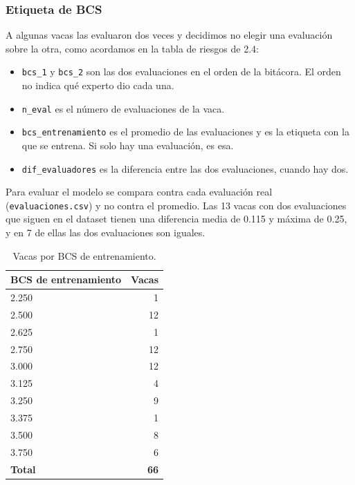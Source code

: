 \subsubsection*{Etiqueta de BCS}

A algunas vacas las evaluaron dos veces y decidimos no elegir una evaluación sobre la otra, como acordamos en la tabla de riesgos de 2.4:

\begin{itemize}
  \item \texttt{bcs\_1} y \texttt{bcs\_2} son las dos evaluaciones en el orden de la bitácora. El orden no indica qué experto dio cada una.
  \item \texttt{n\_eval} es el número de evaluaciones de la vaca.
  \item \texttt{bcs\_entrenamiento} es el promedio de las evaluaciones y es la etiqueta con la que se entrena. Si solo hay una evaluación, es esa.
  \item \texttt{dif\_evaluadores} es la diferencia entre las dos evaluaciones, cuando hay dos.
\end{itemize}

Para evaluar el modelo se compara contra cada evaluación real (\nolinkurl{evaluaciones.csv}) y no contra el promedio. Las 13 vacas con dos evaluaciones que siguen en el dataset tienen una diferencia media de 0.115 y máxima de 0.25, y en 7 de ellas las dos evaluaciones son iguales.

\begin{table}[H]
  \centering
  \caption{Vacas por BCS de entrenamiento.}
  \label{tab:bcs-entrenamiento}
  \begin{tabular}{lr}
    \toprule
    BCS de entrenamiento & Vacas \\
    \midrule
    2.250 & 1 \\
    2.500 & 12 \\
    2.625 & 1 \\
    2.750 & 12 \\
    3.000 & 12 \\
    3.125 & 4 \\
    3.250 & 9 \\
    3.375 & 1 \\
    3.500 & 8 \\
    3.750 & 6 \\
    \midrule
    \textbf{Total} & \textbf{66} \\
    \bottomrule
  \end{tabular}
\end{table}

